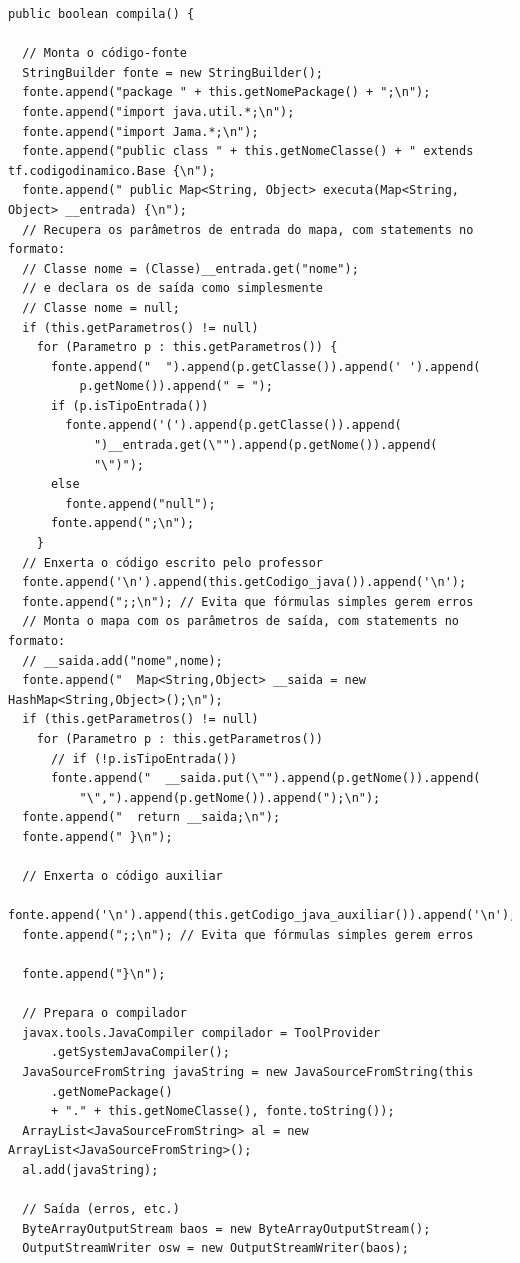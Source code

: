 \documentclass{abnt}
\newenvironment{mylisting}
{\begin{list}{}{\setlength{\leftmargin}{1em}}\item\scriptsize\bfseries}
{\end{list}}
\begin{document}
\begin{mylisting}
\begin{verbatim}
public boolean compila() {

  // Monta o código-fonte
  StringBuilder fonte = new StringBuilder();
  fonte.append("package " + this.getNomePackage() + ";\n");
  fonte.append("import java.util.*;\n");
  fonte.append("import Jama.*;\n");
  fonte.append("public class " + this.getNomeClasse() + " extends tf.codigodinamico.Base {\n");
  fonte.append(" public Map<String, Object> executa(Map<String, Object> __entrada) {\n");
  // Recupera os parâmetros de entrada do mapa, com statements no formato:
  // Classe nome = (Classe)__entrada.get("nome");
  // e declara os de saída como simplesmente
  // Classe nome = null;
  if (this.getParametros() != null)
    for (Parametro p : this.getParametros()) {
      fonte.append("  ").append(p.getClasse()).append(' ').append(
          p.getNome()).append(" = ");
      if (p.isTipoEntrada())
        fonte.append('(').append(p.getClasse()).append(
            ")__entrada.get(\"").append(p.getNome()).append(
            "\")");
      else
        fonte.append("null");
      fonte.append(";\n");
    }
  // Enxerta o código escrito pelo professor
  fonte.append('\n').append(this.getCodigo_java()).append('\n');
  fonte.append(";;\n"); // Evita que fórmulas simples gerem erros 
  // Monta o mapa com os parâmetros de saída, com statements no formato:
  // __saida.add("nome",nome);
  fonte.append("  Map<String,Object> __saida = new HashMap<String,Object>();\n");
  if (this.getParametros() != null)
    for (Parametro p : this.getParametros())
      // if (!p.isTipoEntrada())
      fonte.append("  __saida.put(\"").append(p.getNome()).append(
          "\",").append(p.getNome()).append(");\n");
  fonte.append("  return __saida;\n");
  fonte.append(" }\n");
  
  // Enxerta o código auxiliar
  fonte.append('\n').append(this.getCodigo_java_auxiliar()).append('\n');
  fonte.append(";;\n"); // Evita que fórmulas simples gerem erros
  
  fonte.append("}\n");

  // Prepara o compilador
  javax.tools.JavaCompiler compilador = ToolProvider
      .getSystemJavaCompiler();
  JavaSourceFromString javaString = new JavaSourceFromString(this
      .getNomePackage()
      + "." + this.getNomeClasse(), fonte.toString());
  ArrayList<JavaSourceFromString> al = new ArrayList<JavaSourceFromString>();
  al.add(javaString);

  // Saída (erros, etc.)
  ByteArrayOutputStream baos = new ByteArrayOutputStream();
  OutputStreamWriter osw = new OutputStreamWriter(baos);


\end{verbatim}
\end{mylisting}
\end{document}
